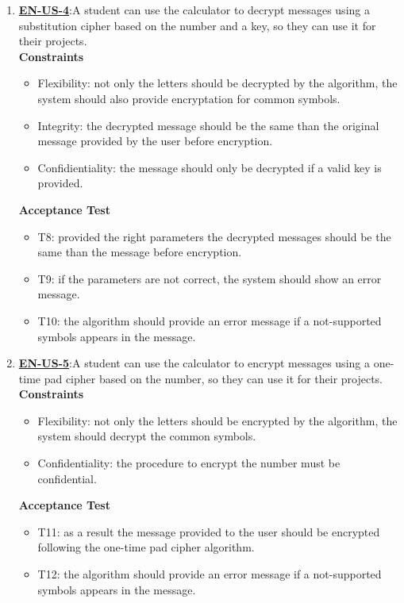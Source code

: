 \documentclass{report}
\begin{document}
\begin{enumerate}
\item \underline{\textbf{EN-US-4}}:A student can use the calculator to decrypt messages using a substitution cipher based on the number and a key, so they can use it for their projects. \\ \newline
\textbf{Constraints}
\begin{itemize}
    \item Flexibility: not only the letters should be decrypted by the algorithm, the system should also provide encryptation for common symbols. 
    \item Integrity: the decrypted message should be the same than the original message provided by the user before encryption.
    \item Confidientiality: the message should only be decrypted if a valid key is provided.
\end{itemize}

\textbf{Acceptance Test}
\begin{itemize}
    \item T8: provided the right parameters the decrypted messages should be the same than the message before encryption.
    \item T9: if the parameters are not correct, the system should show an error message.
    \item T10: the algorithm should provide an error message if a not-supported symbols appears in the message.
\end{itemize}

\item \underline{\textbf{EN-US-5}}:A student can use the calculator to encrypt messages using a one-time pad cipher based on the number, so they can use it for their projects. \\ \newline
\textbf{Constraints}
\begin{itemize}
    \item Flexibility: not only the letters should be encrypted by the algorithm, the system should decrypt the common symbols. 
    \item Confidentiality: the procedure to encrypt the number must be confidential.
\end{itemize}

\textbf{Acceptance Test}
\begin{itemize}
    \item T11: as a result the message provided to the user should be encrypted following the one-time pad cipher algorithm.
    \item T12: the algorithm should provide an error message if a not-supported symbols appears in the message. \newline
\end{itemize}


\end{enumerate}
\end{document}
